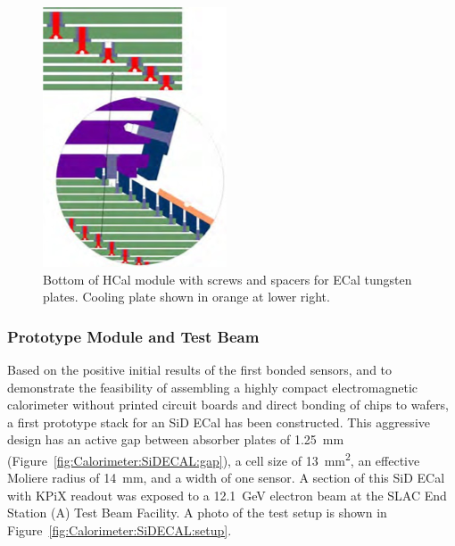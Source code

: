 \begin{figure}
\begin{minipage}[b]{.23\textwidth}
		\includegraphics[width=\linewidth,valign=t]{Calorimeter/SiliconTungstenSiD/HCal-ECal.png}
		\caption{Bottom of HCal module with screws and spacers
for ECal tungsten plates. Cooling plate shown in orange at lower right.}
		\label{fig:Calorimeter:SiDECAL:HCal-ECal}
	\end{minipage}
\end{figure}

\subsubsection{Prototype Module and Test Beam}
Based on the positive initial results of the first bonded sensors, and to demonstrate the feasibility of assembling a highly compact electromagnetic calorimeter without printed circuit boards and direct bonding of chips to wafers, a first prototype stack for an SiD ECal has been constructed. This aggressive design has an active gap between  absorber  plates of \SI{1.25}{mm} (Figure~\ref{fig:Calorimeter:SiDECAL:gap}), a cell size of \SI{13}{\milli\meter\squared}, an effective Moliere radius of \SI{14}{mm}, and a width of one sensor. A section of this SiD ECal with KPiX readout was exposed to a \SI{12.1}{GeV} electron  beam  at the SLAC End Station (A) Test Beam Facility. A photo of the test setup is shown in Figure~\ref{fig:Calorimeter:SiDECAL:setup}.

